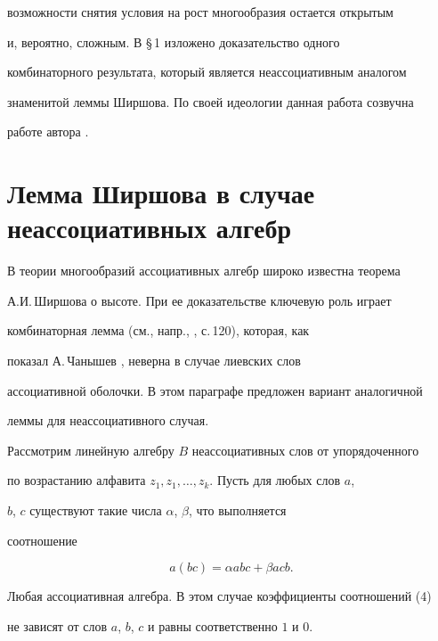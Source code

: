 возможности снятия условия на рост многообразия остается открытым


и, вероятно, сложным. В \S\,1 изложено доказательство одного


комбинаторного результата, который является неассоциативным аналогом


знаменитой леммы Ширшова. По своей идеологии данная работа созвучна


работе автора \cite{3}.





\section{Лемма Ширшова в случае неассоциативных алгебр}





В теории многообразий ассоциативных алгебр широко известна теорема


А.И.\,Ширшова о высоте. При ее доказательстве ключевую роль играет


комбинаторная лемма (см., напр., \cite{4}, с.\,120), которая, как


показал А.\,Чанышев \cite{5}, неверна в случае лиевских слов


ассоциативной оболочки. В этом параграфе предложен вариант аналогичной


леммы для неассоциативного случая.





Рассмотрим линейную алгебру $B$ неассоциативных слов от упорядоченного


по возрастанию алфавита $z_1,z_1,\dotsc,z_k$. Пусть для любых слов $a$,


$b$, $c$ существуют такие числа $\alpha$, $\beta$, что выполняется


соотношение


\begin{equation}


a(bc)=\alpha abc+\beta acb.


\end{equation}





\begin{exam}


Любая ассоциативная алгебра. В этом случае коэффициенты соотношений (4)


не зависят от слов $a$, $b$, $c$ и равны соответственно $1$ и $0$.


\end{exam}





